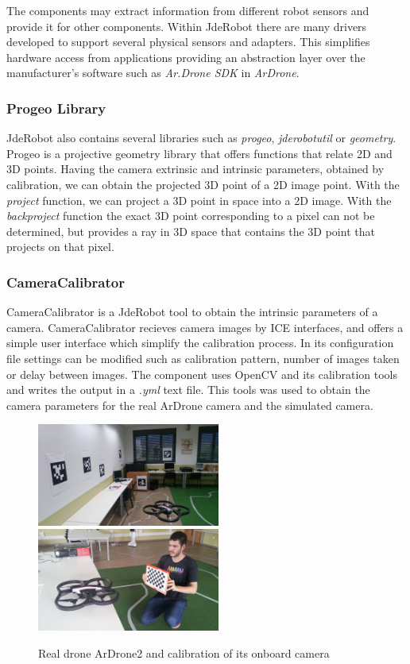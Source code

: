 \documentclass{styles/svproc}
\begin{document}
 The components may extract information from different robot sensors and provide it for other components. Within JdeRobot there are many drivers developed to support several physical sensors and adapters. This simplifies hardware access from applications providing an abstraction layer over the manufacturer's software such as \textit{Ar.Drone SDK} in \textit{ArDrone}. 

        \subsubsection{Progeo Library}
        
        JdeRobot also contains several libraries such as \textit{progeo}, \textit{jderobotutil} or \textit{geometry}. Progeo is a projective geometry library that offers functions that relate 2D and 3D points. Having the camera extrinsic and intrinsic parameters, obtained by calibration, we can obtain the projected 3D point of a 2D image point. With the \textit{project} function, we can project a 3D point in space into a 2D image. With the \textit{backproject} function the exact 3D point corresponding to a pixel can not be determined, but provides a ray in 3D space that contains the 3D point that projects on that pixel.

\subsubsection{CameraCalibrator}

	CameraCalibrator is a JdeRobot tool to obtain the intrinsic parameters of a camera. CameraCalibrator recieves camera images by ICE interfaces, and offers a simple user interface which simplify the calibration process. In its configuration file settings can be modified such as calibration pattern, number of images taken or delay between images. The component uses OpenCV and its calibration tools and writes the output in a \textit{.yml} text file. This tools was used to obtain the camera parameters for the real ArDrone camera and the simulated camera.

	\begin{figure}[h]
		\begin{center}
                  {\includegraphics[width=6cm]{realnavigation.png}}
                  {\includegraphics[width=6cm]{calibration.jpg}}
		\end{center}
		\caption{Real drone ArDrone2 and calibration of its onboard camera}
	\end{figure}
\end{document}
